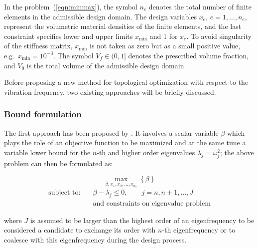\documentclass[pdflatex,lineno,sn-mathphys-ay]{sn-jnl}
\begin{document}
In the problem~(\ref{eqn:minmax}), the symbol $n_e$ denotes the total number of finite elements in the admissible design domain. The design variables $x_e$, $e=1,\ldots,n_e$, represent the volumetric material densities of the finite elements, and the last constraint specifies lower and upper limits $x_{\min}$ and $1$ for $x_e$. To avoid singularity of the stiffness matrix, $x_{\min}$ is not taken as zero but as a small positive value, e.g.\ $x_{\min} = 10^{-3}$.
The symbol $V_f \in (0,1]$ denotes the prescribed volume fraction, and $V_0$ is the total volume of the admissible design domain.

Before proposing a new method for topological optimization with respect to the vibration frequency, two existing approaches will be briefly discussed.

\subsubsection{Bound formulation}

The first approach has been proposed by \citet{Du2007}. It involves a scalar variable $\beta$ which plays the role of an objective function to be maximized and at the same time a variable lower bound for the $n$-th and higher order eigenvalues $\lambda_j = \omega_j^2$; the above problem can then be formulated as:

\begin{equation}
 \max_{\beta,x_1,x_2,\dots,x_{n_e}} \left\{ \beta \right\}
\end{equation}
\begin{align*}
\text{subject to:} \quad & \beta - \lambda_j \le 0, \qquad j = n, n+1, \dots, J \\
& \text{and constraints on eigenvalue problem}
\end{align*}

where $J$ is assumed to be larger than the highest order of an eigenfrequency to be considered a candidate to exchange its order with $n$-th eigenfrequency or to coalesce with this eigenfrequency during the design process.
\end{document}
